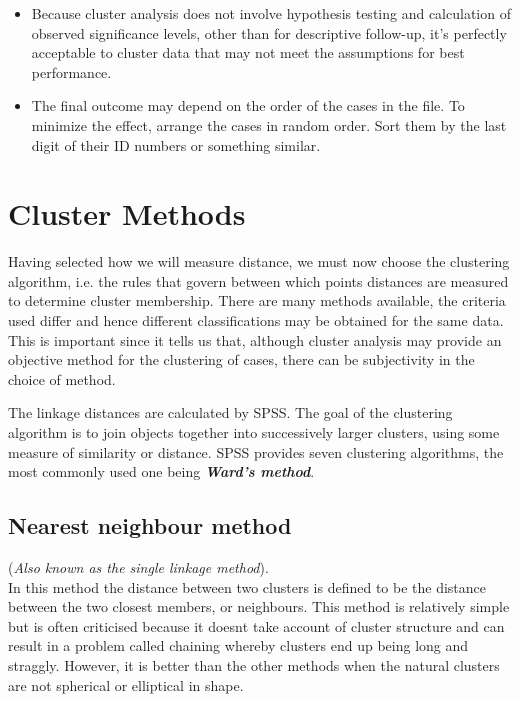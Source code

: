 \documentclass[a4paper,12pt]{article}
\begin{document}
\begin{itemize}
\item 
Because cluster analysis does not involve hypothesis testing and calculation of observed significance levels, other than for descriptive follow-up, it's perfectly acceptable to cluster data that may not meet the assumptions for best performance.
\item 
The final outcome may depend on the order of the cases in the file. To minimize the effect, arrange the cases in random order. Sort them by the last digit of their ID numbers or something similar.
\end{itemize}
\newpage




\section{Cluster Methods}
Having selected how we will measure distance, we must now choose the clustering algorithm, i.e. the rules that govern between which points distances are measured to determine cluster membership. There are many methods available, the criteria used differ and hence
different classifications may be obtained for the same data. This is important since it tells us that, although cluster analysis may provide an objective method for the clustering of cases, there can be subjectivity in the choice of method. 

The linkage distances are calculated by SPSS. The goal of the clustering algorithm is to join objects together into successively larger clusters, using some measure of similarity or distance. SPSS provides seven clustering algorithms, the most commonly used one being  \textbf{\textit{Ward's method}}.


\subsection{Nearest neighbour method} 
(\textit{Also known as the single linkage method}).\\
In this method the distance between two clusters is defined to be the distance between
the two closest members, or neighbours. This method is relatively simple but is often
criticised because it doesnt take account of cluster structure and can result in a problem
called chaining whereby clusters end up being long and straggly. However, it is better
than the other methods when the natural clusters are not spherical or elliptical in shape.
\end{document}
